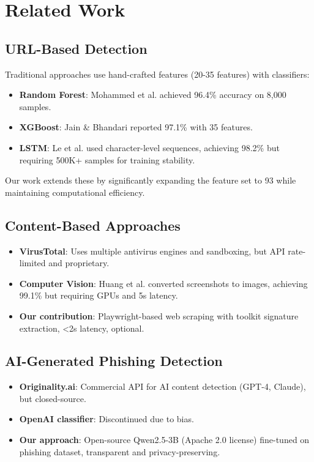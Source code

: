 \documentclass[10pt, conference]{IEEEtran}
\begin{document}
\section{Related Work}
\label{sec:related}

\subsection{URL-Based Detection}

Traditional approaches use hand-crafted features (20-35 features) with classifiers:
\begin{itemize}
    \item \textbf{Random Forest}: Mohammed et al. \cite{mohammed2022} achieved 96.4\% accuracy on 8,000 samples.
    \item \textbf{XGBoost}: Jain \& Bhandari \cite{jain2021} reported 97.1\% with 35 features.
    \item \textbf{LSTM}: Le et al. \cite{le2020} used character-level sequences, achieving 98.2\% but requiring 500K+ samples for training stability.
\end{itemize}

Our work extends these by significantly expanding the feature set to 93 while maintaining computational efficiency.

\subsection{Content-Based Approaches}

\begin{itemize}
    \item \textbf{VirusTotal}: Uses multiple antivirus engines and sandboxing, but API rate-limited and proprietary.
    \item \textbf{Computer Vision}: Huang et al. \cite{huang2023} converted screenshots to images, achieving 99.1\% but requiring GPUs and 5s latency.
    \item \textbf{Our contribution}: Playwright-based web scraping with toolkit signature extraction, <2s latency, optional.
\end{itemize}

\subsection{AI-Generated Phishing Detection}

\begin{itemize}
    \item \textbf{Originality.ai}: Commercial API for AI content detection (GPT-4, Claude), but closed-source.
    \item \textbf{OpenAI classifier}: Discontinued due to bias.
    \item \textbf{Our approach}: Open-source Qwen2.5-3B (Apache 2.0 license) fine-tuned on phishing dataset, transparent and privacy-preserving.
\end{itemize}
\end{document}
